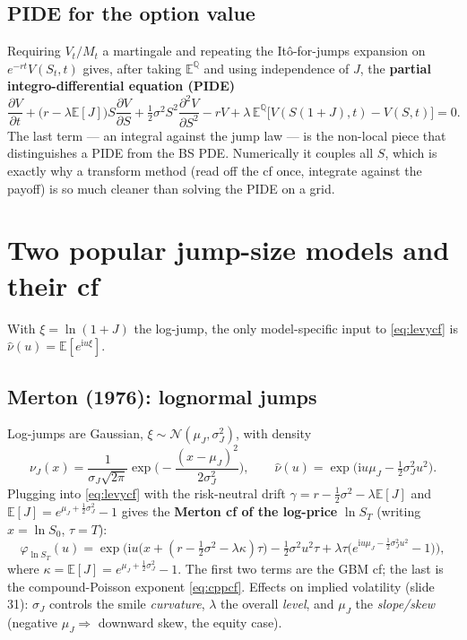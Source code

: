 \documentclass[11pt]{article}
\newcommand{\E}{\mathbb{E}}
\newcommand{\ii}{\mathrm{i}}
\newcommand{\ch}{\varphi}
\begin{document}
\subsection{PIDE for the option value}
Requiring $V_t/M_t$ a martingale and repeating the It\^o-for-jumps expansion on $e^{-rt}V(S_t,t)$ gives,
after taking $\E^{\mathbb Q}$ and using independence of $J$, the
\textbf{partial integro-differential equation (PIDE)}
\[
\frac{\partial V}{\partial t}
+\big(r-\lambda\E[J]\big)S\frac{\partial V}{\partial S}
+\tfrac12\sigma^2S^2\frac{\partial^2 V}{\partial S^2}
-rV
+\lambda\,\E^{\mathbb Q}\!\big[V(S(1+J),t)-V(S,t)\big]=0.
\]
The last term --- an integral against the jump law --- is the non-local piece that distinguishes a PIDE
from the BS PDE. Numerically it couples all $S$, which is exactly why a transform method (read off the cf
once, integrate against the payoff) is so much cleaner than solving the PIDE on a grid.

\section{Two popular jump-size models and their cf}
With $\xi=\ln(1+J)$ the log-jump, the only model-specific input to \eqref{eq:levycf} is $\widehat\nu(u)=\E[e^{\ii u\xi}]$.

\subsection{Merton (1976): lognormal jumps}
Log-jumps are Gaussian, $\xi\sim\mathcal N(\mu_J,\sigma_J^2)$, with density
\[
\nu_J(x)=\frac{1}{\sigma_J\sqrt{2\pi}}\exp\!\Big(-\frac{(x-\mu_J)^2}{2\sigma_J^2}\Big),
\qquad
\widehat\nu(u)=\exp\!\Big(\ii u\mu_J-\tfrac12\sigma_J^2u^2\Big).
\]
Plugging into \eqref{eq:levycf} with the risk-neutral drift $\gamma=r-\tfrac12\sigma^2-\lambda\E[J]$ and
$\E[J]=e^{\mu_J+\frac12\sigma_J^2}-1$ gives the \textbf{Merton cf of the log-price}
$\ln S_T$ (writing $x=\ln S_0$, $\tau=T$):
\begin{equation}\label{eq:mertoncf}
\ch_{\ln S_T}(u)=\exp\!\Big(\ii u\big(x+(r-\tfrac12\sigma^2-\lambda\kappa)\tau\big)
-\tfrac12\sigma^2u^2\tau
+\lambda\tau\big(e^{\ii u\mu_J-\frac12\sigma_J^2u^2}-1\big)\Big),
\end{equation}
where $\kappa=\E[J]=e^{\mu_J+\frac12\sigma_J^2}-1$. The first two terms are the GBM cf; the last is the
compound-Poisson exponent \eqref{eq:cppcf}. Effects on implied volatility (slide 31): $\sigma_J$ controls
the smile \emph{curvature}, $\lambda$ the overall \emph{level}, and $\mu_J$ the \emph{slope/skew}
(negative $\mu_J\Rightarrow$ downward skew, the equity case).
\end{document}
